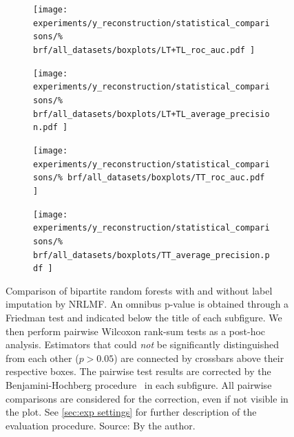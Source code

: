 
\begin{figure}[tb]
    \centering
    \begin{subfigure}{0.49\textwidth}
        \texttt{[image: 
            experiments/y\_reconstruction/statistical\_comparisons/\%
            brf/all\_datasets/boxplots/LT+TL\_roc\_auc.pdf
        ]}
    \end{subfigure}
    \begin{subfigure}{0.49\textwidth}
        \texttt{[image: 
            experiments/y\_reconstruction/statistical\_comparisons/\%
            brf/all\_datasets/boxplots/LT+TL\_average\_precision.pdf
        ]}
    \end{subfigure}

    \begin{subfigure}{0.49\textwidth}
        \texttt{[image: 
            experiments/y\_reconstruction/statistical\_comparisons/\%
            brf/all\_datasets/boxplots/TT\_roc\_auc.pdf
        ]}
    \end{subfigure}
    \begin{subfigure}{0.49\textwidth}
        \texttt{[image: 
            experiments/y\_reconstruction/statistical\_comparisons/\%
            brf/all\_datasets/boxplots/TT\_average\_precision.pdf
        ]}
    \end{subfigure}
    \caption{
        Comparison of bipartite random forests with and without label imputation by NRLMF.
        An omnibus p-value is obtained through a Friedman test and indicated below the title of each subfigure.
        We then perform pairwise Wilcoxon rank-sum tests as a post-hoc analysis.
        Estimators that could \emph{not} be significantly distinguished from each other ($p > 0.05$) are connected by crossbars above their respective boxes. 
        The pairwise test results are corrected by the Benjamini-Hochberg procedure~\cite{benjamini1995controlling,haynes2013benjamini} in each subfigure. All pairwise comparisons are considered for the correction, even if not visible in the plot.
        See \autoref{sec:exp settings} for further description of the evaluation procedure. \newline Source: By the author.
    }
    \label{fig:brf_y_reconstruction}
\end{figure}


